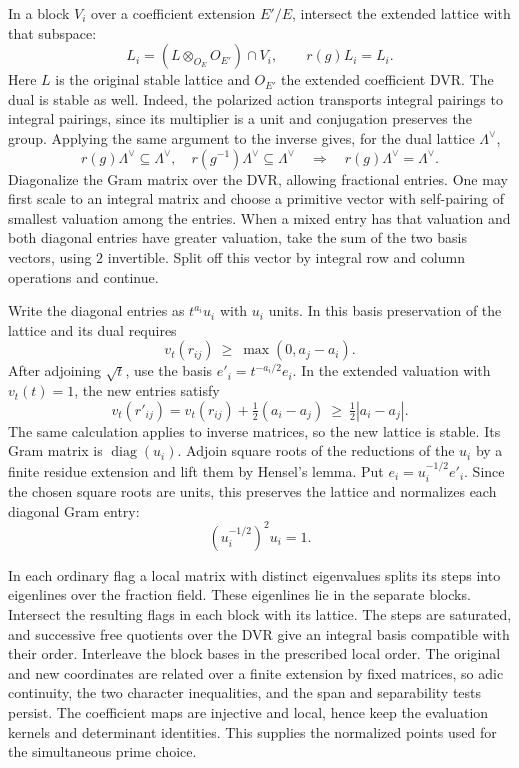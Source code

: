 In a block \(V_i\) over a coefficient extension \(E'/E\), intersect the extended lattice with that subspace: 
\[
 L_i=(L\otimes_{O_E}O_{E'})\cap V_i,\qquad r(g)L_i=L_i.
\]
 Here \(L\) is the original stable lattice and \(O_{E'}\) the extended coefficient DVR. The dual is stable as well. Indeed, the polarized action transports integral pairings to integral pairings, since its multiplier is a unit and conjugation preserves the group. Applying the same argument to the inverse gives, for the dual lattice \(\Lambda^\vee\),
\[
 r(g)\Lambda^\vee\subseteq\Lambda^\vee,\quad r(g^{-1})\Lambda^\vee\subseteq\Lambda^\vee\quad\Longrightarrow\quad r(g)\Lambda^\vee=\Lambda^\vee .
\] Diagonalize the Gram matrix over the DVR,
allowing fractional entries. One may first scale to an integral
matrix and choose a primitive vector with self-pairing of smallest
valuation among the entries. When a mixed entry has that valuation
and both diagonal entries have greater valuation, take the sum of
the two basis vectors, using \(2\) invertible. Split off this
vector by integral row and column operations and continue.

Write the diagonal entries as \(t^{a_i}u_i\) with \(u_i\) units.
In this basis preservation of the lattice and its dual requires
\[
       v_t(r_{ij})\ \ge\ \max(0,a_j-a_i).
\]
After adjoining \(\sqrt t\), use the basis \(e'_i=t^{-a_i/2}e_i\).
In the extended valuation with \(v_t(t)=1\), the new entries satisfy
\[
  v_t(r'_{ij})=v_t(r_{ij})+\tfrac12(a_i-a_j)
                 \ \ge\ \tfrac12|a_i-a_j|.
\]
The same calculation applies to inverse matrices, so the new lattice
is stable. Its Gram matrix is \(\operatorname{diag}(u_i)\).
Adjoin square roots of the reductions of the \(u_i\) by a finite
residue extension and lift them by Hensel's lemma. Put \(e_i=u_i^{-1/2}e'_i\). Since the chosen square roots are units, this preserves the lattice and normalizes each diagonal Gram entry:
\[
 (u_i^{-1/2})^2u_i=1 .
\]

In each ordinary flag a local matrix with distinct
eigenvalues splits its steps into eigenlines over the fraction
field. These eigenlines lie in the separate blocks.
Intersect the resulting flags in each block with its lattice.
The steps are saturated, and successive free quotients over the
DVR give an integral basis compatible with their order. Interleave
the block bases in the prescribed local order. The original and new
coordinates are related over a finite extension by fixed matrices,
so adic continuity, the two character inequalities, and the span
and separability tests persist. The coefficient maps are injective
and local, hence keep the evaluation kernels and determinant
identities. This supplies the normalized points used for the
simultaneous prime choice.

